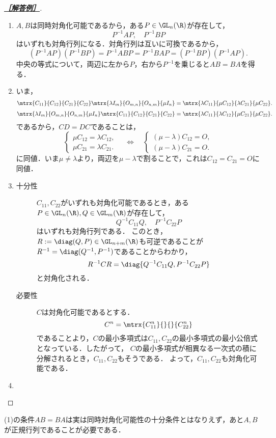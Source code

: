 \documentclass[uplatex,dvipdfmx]{jsarticle}
\begin{document}
\begin{proof}[\textbf{\underline{［解答例］}}]\mbox{}
    \begin{enumerate}
        \item $A,B$は同時対角化可能であるから，ある$P\in\GL_n(\R)$が存在して，
        \[P^{-1}AP,\quad P^{-1}BP\]
        はいずれも対角行列になる．対角行列は互いに可換であるから，
        \[(P^{-1}AP)(P^{-1}BP)=P^{-1}ABP=P^{-1}BAP=(P^{-1}BP)(P^{-1}AP).\]
        中央の等式について，両辺に左から$P$，右から$P^{-1}$を乗じると$AB=BA$を得る．
        \item いま，
        \[\mtrx{C_{11}}{C_{12}}{C_{21}}{C_{22}}\mtrx{\lambda I_m}{O_{m,n}}{O_{n,m}}{\mu I_n}=\mtrx{\lambda C_{11}}{\mu C_{12}}{\lambda C_{21}}{\mu C_{22}}.\]
        \[\mtrx{\lambda I_m}{O_{m,n}}{O_{n,m}}{\mu I_n}\mtrx{C_{11}}{C_{12}}{C_{21}}{C_{22}}=\mtrx{\lambda C_{11}}{\lambda C_{12}}{\mu C_{21}}{\mu C_{22}}.\]
        であるから，$CD=DC$であることは，
        \[\begin{cases}
            \mu C_{12}=\lambda C_{12},\\
            \mu C_{21}=\lambda C_{21}.
        \end{cases}\quad\Leftrightarrow\quad\begin{cases}
            (\mu-\lambda)C_{12}=O,\\
            (\mu-\lambda)C_{21}=O.
        \end{cases}\]
        に同値．いま$\mu\ne\lambda$より，両辺を$\mu-\lambda$で割ることで，これは$C_{12}=C_{21}=O$に同値．
        \item \begin{description}
            \item[十分性] $C_{11},C_{22}$がいずれも対角化可能であるとき，ある$P\in\GL_n(\R),Q\in\GL_m(\R)$が存在して，
            \[Q^{-1}C_{11}Q,\quad P^{-1}C_{22}P\]
            はいずれも対角行列である．
            このとき，$R:=\diag(Q,P)\in\GL_{n+m}(\R)$も可逆であることが$R^{-1}=\diag(Q^{-1},P^{-1})$であることからわかり，
            \[R^{-1}CR=\diag{Q^{-1}C_{11}Q,P^{-1}C_{22}P}\]
            と対角化される．
            \item[必要性] $C$は対角化可能であるとする．
            \[C^n=\mtrx{C_{11}^n}{}{}{C_{22}^n}\]
            であることより，$C$の最小多項式は$C_{11},C_{22}$の最小多項式の最小公倍式となっている．したがって，
            $C$の最小多項式が相異なる一次式の積に分解されるとき，$C_{11},C_{22}$もそうである．
            よって，$C_{11},C_{22}$も対角化可能である．
        \end{description}
        \item 
    \end{enumerate}
\end{proof}
\begin{remark*}
    (1)の条件$AB=BA$は実は同時対角化可能性の十分条件とはなりえず，あと$A,B$が正規行列であることが必要である．
\end{remark*}
\end{document}
